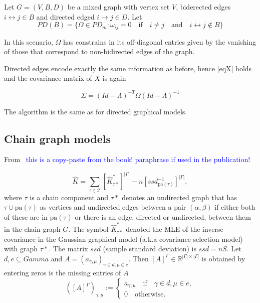 \documentclass[10pt,a4paper]{article}
\begin{document}
Let $G=(V,B,D)$ be a mixed graph with vertex set $V$, biderected edges $i \leftrightarrow j \in B$ and directed edged $i \rightarrow j \in D$. Let 
\[PD(B) = \{ \Omega \in PD_m : \omega_{ij} = 0 \quad \text{if} \quad i \neq j\quad \text{and} \quad i \leftrightarrow j \notin B\}\]

In this scenario, $\Omega$ has constrains in its off-diagonal entries given by the vanishing of those that correspond to non-bidirected edges of the graph. 

Directed edges encode exactly the same information as before, hence {\ref{eqX}} holds and
the covariance matrix of $X$ is again

$$\Sigma=(Id-\Lambda)^{-T}\Omega(Id-\Lambda)^{-1}$$

The algorithm is the same as for directed graphical models.


\subsection{Chain graph models}
From~\cite[Section 5.4.1]{lauritzen1996graphical} \textcolor{blue}{this is a copy-paste from the book! paraphrase if used in the publication!}

\begin{equation}
\hat{K}=\sum\limits_{\tau \in \mathcal{T}}[\hat{K}^*_{\tau*}]^{|\Gamma|}-n[ssd_{\text{pa}(\tau)}^{-1}]^{|\Gamma|},
\end{equation}
where $\tau$ is a chain component and $\tau*$ denotes an undirected graph that has $\tau \cup \text{pa}(\tau)$ as vertices and undirected edges between a pair $(\alpha,\beta)$ if either both of these are in $\text{pa}(\tau)$ or there is an edge, directed or undirected, between them in the chain graph $G$. The symbol $\hat{K}^*_{\tau*}$ denoted the MLE of the inverse covariance in the Gaussian graphical model (a.k.a  covariance selection model) with graph $\tau*$. The matrix $ssd$ (sample standard deviation) is $ssd=nS$.
Let $d,e\subseteq Gamma$ and $A=(a_{\gamma,\mu})_{\gamma \in d, \mu \in e}$. Then $[A]^\Gamma \in \mathbb{R}^{|\Gamma|\times |\Gamma|}$ is obtained by entering zeros is the missing entries of $A$
\[
([A]^\Gamma)_{\gamma,\mu}:=
\begin{cases}
a_{\gamma,\mu} \quad \text{if} \quad \gamma \in d, \mu \in e,\\
0 \quad \text{otherwise.}
\end{cases}
\] 
\end{document}
